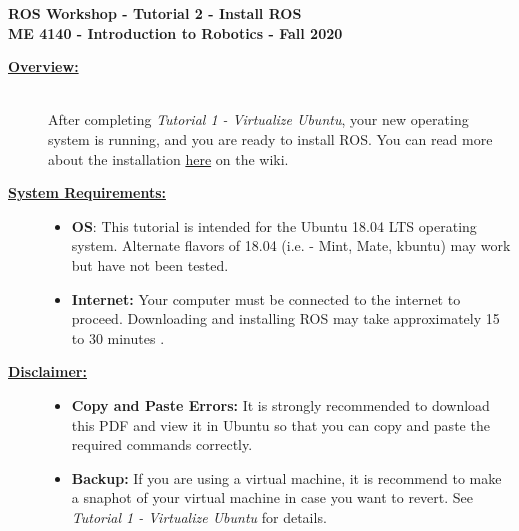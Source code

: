 \documentclass[12pt]{article}
\newcommand{\R}{\color{red}}
\begin{document}

\begin{center}
   {\bf \Large ROS Workshop - Tutorial 2 - Install ROS}\vspace{3mm} \\
   {\bf \large ME 4140 - Introduction to Robotics - Fall 2020} \vspace{5mm}\\
\end{center}

\begin{description}

\item[\textbf{\underline{Overview:}}] \hfill \vspace{3mm}\\
After completing {\it Tutorial 1 - Virtualize Ubuntu}, your new operating system is running, and you are ready to install ROS. You can read more about the installation \href{http://wiki.ros.org/melodic/Installation/Ubuntu}{here} on the wiki.

\item[\textbf{\underline{System Requirements:}}] \hfill \vspace{0mm}

\begin{itemize}
	\item {\bf OS}: This tutorial is intended for the Ubuntu 18.04 LTS operating system. Alternate flavors of 18.04 (i.e. - Mint, Mate, kbuntu) may work but have not been tested.
	\item {\bf Internet:} Your computer must be connected to the internet to proceed. Downloading and installing ROS may take approximately 15 to 30 minutes .


\end{itemize}

\item[\textbf{\underline{Disclaimer:}}] \hfill \vspace{0mm}

\begin{itemize}
	\item {\bf\R Copy and Paste Errors:} {\R It is strongly recommended to download this PDF and view it in Ubuntu so that you can copy and paste the required commands correctly.}

	\item {\bf Backup: } If you are using a virtual machine, it is recommend to make a snaphot of your virtual machine in case you want to revert. See {\it Tutorial 1 - Virtualize Ubuntu } for details.   
\end{itemize}


\end{description}
\end{document}
